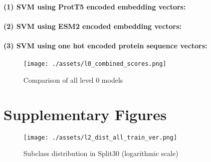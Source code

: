 \documentclass{bioinfo}
\begin{document}
%

\paragraph{(1) SVM using ProtT5 encoded embedding vectors:}

\lipsum[1]
\paragraph{(2) SVM using ESM2 encoded embedding vectors:}

\lipsum[1]
\paragraph{(3) SVM using one hot encoded protein sequence vectors:}
\lipsum[1]


\begin{figure}[!tb]
	\texttt{[image: ./assets/l0\_combined\_scores.png]}
	\caption{Comparison of all level 0 models}
	\label{fig:l0_comp_all}
\end{figure}


\section{Supplementary Figures}\label{sec:supplementary figures}
\begin{figure}[!th]
\texttt{[image: ./assets/l2\_dist\_all\_train\_ver.png]}
\caption{Subclass distribution in Split30 (logarithmic scale)}\label{fig:l2_dist_train}
\end{figure}
\newpage

 

\end{document}
